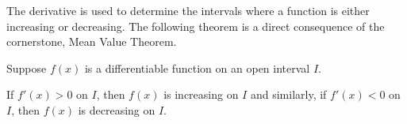 \documentclass{ximera}
\begin{document}










The derivative is used to determine the intervals where a function is either increasing or decreasing.
The following theorem is a direct consequence of the cornerstone, Mean Value Theorem.


\begin{theorem}
Suppose $f(x)$ is a differentiable function on an open interval $I$.

 If $f'(x) > 0$ on $I$, 
then $f(x)$ is increasing on $I$ and similarly, if $f'(x) < 0$ on $I$, then $f(x)$ is decreasing on $I$.
\end{theorem}
\end{document}
